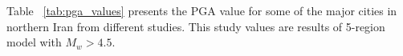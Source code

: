 

Table ~\ref{tab:pga_values} presents the PGA value for some of the major cities in northern Iran from different studies. This study values are results of 5-region model with $M_w > 4.5 $.

